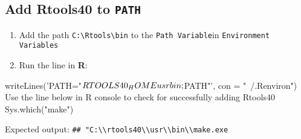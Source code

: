 \documentclass[]{article}
\renewenvironment{verbatim}{\color{codecolor}\begin{myshaded}\begin{oldverbatim}}{\end{oldverbatim}\end{myshaded}}
\begin{document}
\hypertarget{add-rtools40-to-path}{%
\subsection{\texorpdfstring{Add \textbf{Rtools40} to \texttt{PATH}}{Add Rtools40 to PATH}}\label{add-rtools40-to-path}}

\begin{enumerate}
\def\labelenumi{\arabic{enumi}.}
\item
  Add the path \texttt{C:\textbackslash{}Rtools\textbackslash{}bin} to the \texttt{Path Variable}in \texttt{Environment Variables}
\item
  Run the line in \textbf{R}:\\
\end{enumerate}

\begin{verbatim}
writeLines('PATH="${RTOOLS40_HOME}\\usr\\bin;${PATH}"', con = "~/.Renviron")
Use the line below in R console to check for successfully adding Rtools40
Sys.which("make")
\end{verbatim}

Expected output: \texttt{\#\# "C:\textbackslash{}\textbackslash{}rtools40\textbackslash{}\textbackslash{}usr\textbackslash{}\textbackslash{}bin\textbackslash{}\textbackslash{}make.exe}
\end{document}
